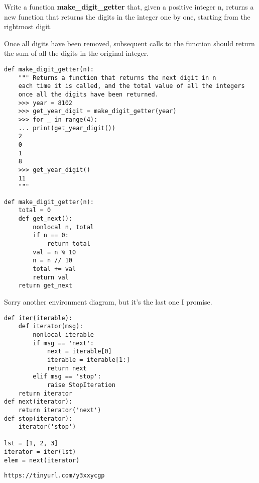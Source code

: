 \newpage

\question
Write a function \textbf{make\_digit\_getter} that, given a positive integer n, returns a new function that returns the digits in the integer one by one, starting from the rightmost digit. 

Once all digits have been removed, subsequent calls to the function should return the sum of all the digits in the original integer.

\begin{lstlisting}
def make_digit_getter(n):
	""" Returns a function that returns the next digit in n
	each time it is called, and the total value of all the integers
	once all the digits have been returned.
	>>> year = 8102
	>>> get_year_digit = make_digit_getter(year)
	>>> for _ in range(4):
	... print(get_year_digit())
	2
	0
	1
	8
	>>> get_year_digit()
	11
	"""

\end{lstlisting}
\begin{solution}
\begin{lstlisting}
def make_digit_getter(n):
	total = 0
	def get_next():
		nonlocal n, total
		if n == 0:
			return total
		val = n % 10
		n = n // 10
		total += val
		return val
	return get_next
\end{lstlisting}
\end{solution}


\newpage

\question
Sorry another environment diagram, but it's the last one I promise.

\begin{lstlisting}
def iter(iterable):
    def iterator(msg):
        nonlocal iterable
        if msg == 'next':
            next = iterable[0]
            iterable = iterable[1:]
            return next
        elif msg == 'stop':
            raise StopIteration
    return iterator 
def next(iterator):
    return iterator('next')
def stop(iterator):
    iterator('stop')
    
lst = [1, 2, 3]
iterator = iter(lst)
elem = next(iterator)

\end{lstlisting}
\begin{solution}
\begin{lstlisting}
https://tinyurl.com/y3xxycgp
\end{lstlisting}
\end{solution}
